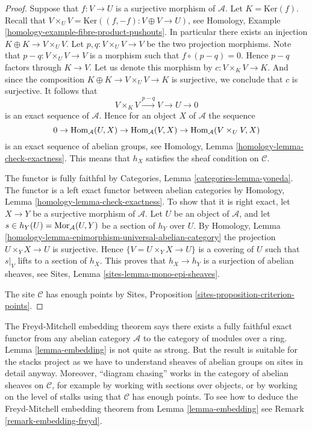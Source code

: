 \begin{proof}
Suppose that $f : V \to U$ is a surjective morphism of $\mathcal{A}$.
Let $K = \text{Ker}(f)$. Recall that
$V \times_U V = \text{Ker}((f, -f) : V \oplus V \to U)$, see
Homology, Example \ref{homology-example-fibre-product-pushouts}.
In particular there exists an injection $K \oplus K \to V \times_U V$.
Let $p, q : V \times_U V \to V$ be the two projection morphisms.
Note that $p - q : V \times_U V \to V$ is a morphism such that
$f \circ (p  - q) = 0$. Hence $p - q$ factors through $K \to V$.
Let us denote this morphism by $c : V \times_K V \to K$.
And since the composition $K \oplus K \to V \times_U V \to K$
is surjective, we conclude that $c$ is surjective. It follows that
$$
V \times_K V \xrightarrow{p - q} V \to U \to 0
$$
is an exact sequence of $\mathcal{A}$.
Hence for an object $X$ of $\mathcal{A}$ the sequence
$$
0 \to
\mathop{\rm Hom}\nolimits_\mathcal{A}(U, X) \to
\mathop{\rm Hom}\nolimits_\mathcal{A}(V, X) \to
\mathop{\rm Hom}\nolimits_\mathcal{A}(V \times_U V, X)
$$
is an exact sequence of abelian groups, see
Homology, Lemma \ref{homology-lemma-check-exactness}.
This means that $h_X$ satisfies the sheaf condition
on $\mathcal{C}$.

\medskip\noindent
The functor is fully faithful by
Categories, Lemma \ref{categories-lemma-yoneda}.
The functor is a left exact functor between abelian categories by
Homology, Lemma \ref{homology-lemma-check-exactness}.
To show that it is right exact, let $X \to Y$ be a surjective morphism
of $\mathcal{A}$. Let $U$ be an object of $\mathcal{A}$, and let
$s \in h_Y(U) = \mathop{\rm Mor}\nolimits_\mathcal{A}(U, Y)$ be a section of $h_Y$
over $U$. By
Homology, Lemma \ref{homology-lemma-epimorphism-universal-abelian-category}
the projection $U \times_Y X \to U$ is surjective.
Hence $\{V = U \times_Y X \to U\}$ is a covering of $U$ such that
$s|_V$ lifts to a section of $h_X$. This proves that
$h_X \to h_Y$ is a surjection of abelian sheaves, see
Sites, Lemma \ref{sites-lemma-mono-epi-sheaves}.

\medskip\noindent
The site $\mathcal{C}$ has enough points by
Sites, Proposition \ref{sites-proposition-criterion-points}.
\end{proof}

\begin{remark}
\label{remark-embedding}
The Freyd-Mitchell embedding theorem says there exists a fully faithful
exact functor from any abelian category $\mathcal{A}$
to the category of modules over a ring.
Lemma \ref{lemma-embedding}
is not quite as strong. But the result is suitable for the
stacks project as we have to understand sheaves of abelian groups on
sites in detail anyway. Moreover, ``diagram chasing'' works in the category
of abelian sheaves on $\mathcal{C}$, for example by working with sections over
objects, or by working on the level of stalks using that $\mathcal{C}$ has
enough points. To see how to deduce the Freyd-Mitchell embedding theorem from
Lemma \ref{lemma-embedding}
see
Remark \ref{remark-embedding-freyd}.
\end{remark}

